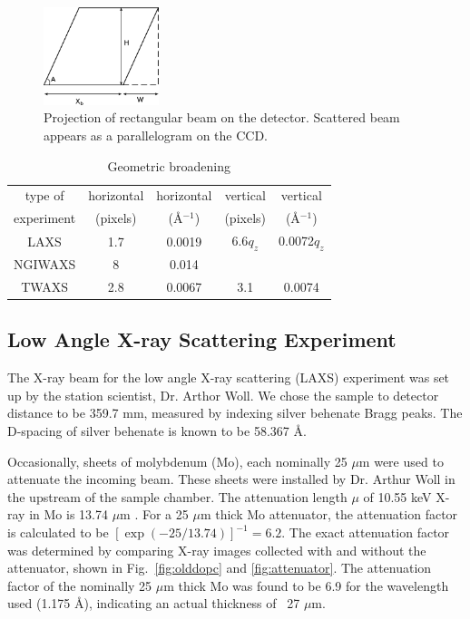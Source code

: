\begin{figure}[htbp]
  \centering
  \includegraphics[width=0.3\textwidth]{figures/ripple/MMs/transmission/geometric_broadening4}
  \caption{Projection of rectangular beam on the detector. Scattered beam
  appears as a parallelogram on the CCD.}
  \label{fig:gb_trans3}
\end{figure}

\begin{table}[p]
  \centering
  \begin{tabular}{ccccc}
    \hline
    type of & horizontal & horizontal & vertical & vertical \\
    experiment & (pixels) & (\AA$^{-1}$) & (pixels) & (\AA$^{-1}$) \\
    \hline
    LAXS & 1.7 & 0.0019 & 6.6$q_z$ & 0.0072$q_z$ \\
    NGIWAXS & 8 & 0.014 &  & \\
    TWAXS & 2.8 & 0.0067 & 3.1 & 0.0074 \\
    \hline
  \end{tabular}
  \caption{Geometric broadening}
  \label{tb:geometric_broadening}
\end{table}

\newpage
\subsection{Low Angle X-ray Scattering Experiment}\label{sec:LAXS_method}
The X-ray beam for the low angle X-ray scattering (LAXS) experiment 
was set up by the station scientist, Dr. Arthor Woll.
We chose the sample to detector distance to be 359.7 mm, measured by indexing
silver behenate Bragg peaks. The D-spacing of silver behenate is known to be
58.367 \AA.

Occasionally, sheets of molybdenum (Mo), each nominally 25 $\mu$m were 
used to attenuate the incoming beam. 
These sheets were installed by Dr. Arthur Woll in the upstream of the sample chamber.
The attenuation length $\mu$ of 10.55 keV X-ray in Mo is 13.74 $\mu$m \cite{ref:cxro}.
For a 25 $\mu$m thick Mo attenuator, the attenuation factor is calculated to be
$[\exp(-25/13.74)]^{-1} = 6.2$. The exact attenuation factor was determined
by comparing X-ray images collected with and without the attenuator, 
shown in Fig.~\ref{fig:olddopc} and \ref{fig:attenuator}.
The attenuation factor of the nominally 25 $\mu$m thick Mo was found to 
be 6.9 for the wavelength used (1.175 \AA), indicating an actual thickness
of ~27 $\mu$m. 

